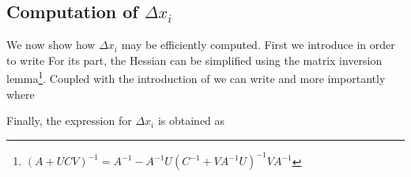 \subsection{Computation of $\Delta x_i$}
We now show how $\Delta x_i$ may be efficiently computed.
First we introduce
    in order to write
For its part, the Hessian can be simplified using the matrix inversion lemma\footnote{$(A + UCV)^{-1} = A^{-1} - A^{-1}U (C^{-1} + V A^{-1} U)^{-1} V A^{-1}$}.
Coupled with the introduction of 
    we can write
    and more importantly
    where
 
Finally, the expression for $\Delta x_i$ is obtained as
        
